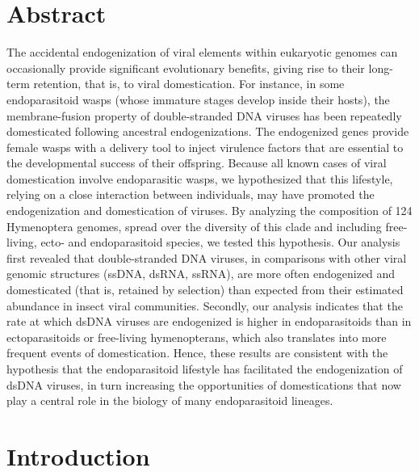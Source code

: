 \section{Abstract}

The accidental endogenization of viral elements within eukaryotic genomes can occasionally provide significant evolutionary benefits, giving rise to their long-term retention, that is, to viral domestication. For instance, in some endoparasitoid wasps (whose immature stages develop inside their hosts), the membrane-fusion property of double-stranded DNA viruses has been repeatedly domesticated following ancestral
endogenizations. The endogenized genes provide female wasps with a delivery tool to inject virulence factors that are essential to the developmental success of their offspring. Because all known cases of viral domestication involve endoparasitic wasps, we hypothesized that this lifestyle, relying on a close interaction between individuals, may have promoted the endogenization and domestication of viruses. By analyzing the composition of 124 Hymenoptera genomes, spread over the diversity of this clade and including free-living, ecto- and endoparasitoid species, we tested this hypothesis. Our analysis first revealed that double-stranded DNA viruses, in comparisons with other viral genomic structures (ssDNA, dsRNA, ssRNA), are more often endogenized and domesticated (that is, retained by selection) than expected from their estimated abundance in insect viral communities. Secondly, our analysis indicates that the rate at which dsDNA viruses are endogenized is higher in endoparasitoids than in ectoparasitoids or free-living hymenopterans, which also translates into more frequent events of domestication. Hence, these results are consistent with the hypothesis that the endoparasitoid lifestyle has facilitated the endogenization of dsDNA viruses, in turn increasing the opportunities of domestications that now play a central role in the biology of many endoparasitoid lineages.


\section{Introduction}

